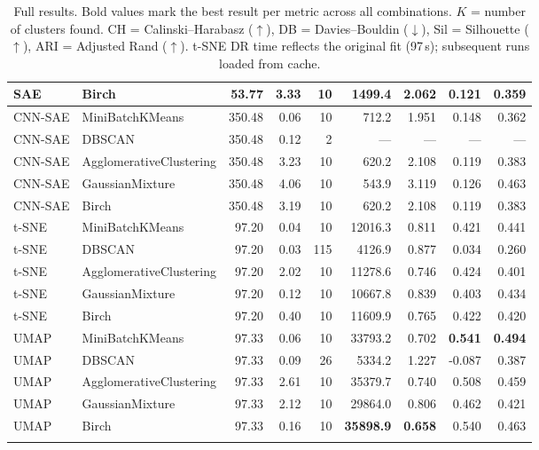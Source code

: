 \begin{longtable}{llrrrrrrr}
SAE       & Birch                   &   53.77 &  3.33 & 10 & 1499.4  & 2.062 & 0.121 & 0.359 \\
\midrule
CNN-SAE   & MiniBatchKMeans         &  350.48 &  0.06 & 10 &  712.2  & 1.951 & 0.148 & 0.362 \\
CNN-SAE   & DBSCAN                  &  350.48 &  0.12 &  2 & ---     & ---   & ---   & ---   \\
CNN-SAE   & AgglomerativeClustering &  350.48 &  3.23 & 10 &  620.2  & 2.108 & 0.119 & 0.383 \\
CNN-SAE   & GaussianMixture         &  350.48 &  4.06 & 10 &  543.9  & 3.119 & 0.126 & 0.463 \\
CNN-SAE   & Birch                   &  350.48 &  3.19 & 10 &  620.2  & 2.108 & 0.119 & 0.383 \\
\midrule
t-SNE     & MiniBatchKMeans         &   97.20 &  0.04 & 10 & 12016.3 & 0.811 & 0.421 & 0.441 \\
t-SNE     & DBSCAN                  &   97.20 &  0.03 & 115 & 4126.9 & 0.877 & 0.034 & 0.260 \\
t-SNE     & AgglomerativeClustering &   97.20 &  2.02 & 10 & 11278.6 & 0.746 & 0.424 & 0.401 \\
t-SNE     & GaussianMixture         &   97.20 &  0.12 & 10 & 10667.8 & 0.839 & 0.403 & 0.434 \\
t-SNE     & Birch                   &   97.20 &  0.40 & 10 & 11609.9 & 0.765 & 0.422 & 0.420 \\
\midrule
UMAP      & MiniBatchKMeans         &   97.33 &  0.06 & 10 & 33793.2 & 0.702 & \textbf{0.541} & \textbf{0.494} \\
UMAP      & DBSCAN                  &   97.33 &  0.09 & 26 &  5334.2 & 1.227 & -0.087 & 0.387 \\
UMAP      & AgglomerativeClustering &   97.33 &  2.61 & 10 & 35379.7 & 0.740 & 0.508 & 0.459 \\
UMAP      & GaussianMixture         &   97.33 &  2.12 & 10 & 29864.0 & 0.806 & 0.462 & 0.421 \\
UMAP      & Birch                   &   97.33 &  0.16 & 10 & \textbf{35898.9} & \textbf{0.658} & 0.540 & 0.463 \\
\bottomrule
\caption{Full results. Bold values mark the best result per metric across all combinations.
  $K$ = number of clusters found. CH = Calinski--Harabasz ($\uparrow$),
  DB = Davies--Bouldin ($\downarrow$), Sil = Silhouette ($\uparrow$), ARI = Adjusted Rand ($\uparrow$).
  t-SNE DR time reflects the original fit (97\,s); subsequent runs loaded from cache.}
\label{tab:full}
\end{longtable}

